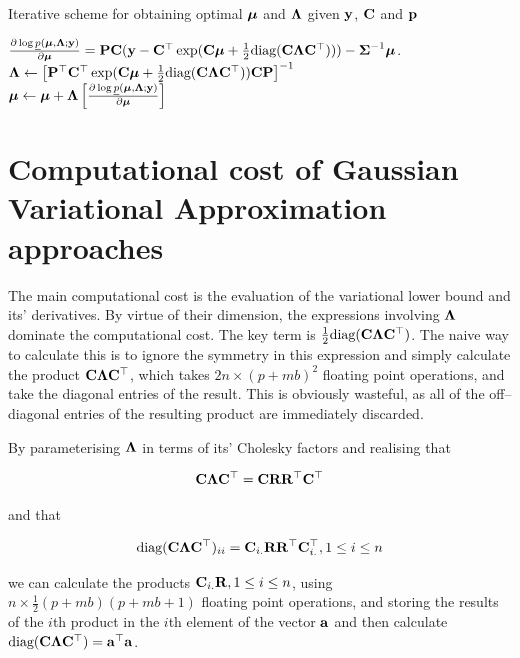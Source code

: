 \documentclass{amsart}[12pt]
\begin{document}
	\begin{algorithm}
		\caption[Algorithm GVA NR]{Iterative scheme for obtaining optimal ${\boldsymbol \mu}$ and ${\boldsymbol \Lambda}$
			given ${\bf y}$, ${\bf C}$ and ${\bf p}$}
		\label{alg:algorithm_nr}
		\begin{algorithmic}
			\REQUIRE $\frac{\partial \log \underline{p}({\boldsymbol \mu}, {\boldsymbol \Lambda}; {\bf y})}{\partial {\boldsymbol\mu}} = {\bf P} {\bf C} ({\bf y} - {\bf C}^\top \exp({\bf C} {\boldsymbol \mu} + \tfrac{1}{2} \text{diag}{({\bf C}{\boldsymbol\Lambda}{\bf C}^\top)})) - {\boldsymbol \Sigma}^{-1} {\boldsymbol \mu}$.
			\STATE ${\boldsymbol \Lambda} \leftarrow \left [ {\bf P}^\top {\bf C}^\top \exp({\bf C} {\boldsymbol \mu} + \tfrac{1}{2} \text{diag}({\bf C} {\boldsymbol \Lambda} {\bf C}^\top)) {\bf C} {\bf P} \right ]^{-1}$ \\ [1ex]
			\STATE ${\boldsymbol \mu} \leftarrow {\boldsymbol\mu} + {\boldsymbol \Lambda} \left [ \frac{\partial \log \underline{p}({\boldsymbol \mu}, {\boldsymbol \Lambda}; {\bf y})}{\partial {\boldsymbol\mu}} \right ]$
			\ENDWHILE
		\end{algorithmic}
	\end{algorithm}
		
		
	\section{Computational cost of Gaussian Variational Approximation approaches}
	
	The main computational cost is the evaluation of the variational lower bound and its' derivatives. By virtue
	of their dimension, the expressions involving ${\boldsymbol \Lambda}$ dominate the computational cost. The key term is
	$\frac{1}{2} \text{diag}({\bf C} {\boldsymbol \Lambda} {\bf C}^\top)$. The naive way to calculate this is to ignore the symmetry in
	this expression and simply calculate the product ${\bf C} {\boldsymbol \Lambda} {\bf C}^\top$, which takes $2 n \times (p + m
	b)^2$ floating point operations, and take the diagonal entries of the result. This is obviously wasteful, as
	all of the off--diagonal entries of the resulting product are immediately discarded.
	
	\noindent By parameterising ${\boldsymbol \Lambda}$ in terms of its' Cholesky factors and realising that
	
	\[
		{\bf C} {\boldsymbol \Lambda} {\bf C}^\top = {\bf C} {\bf R} {\bf R}^\top {\bf C}^\top
	\]
	
	\noindent and that
	
	\[
		\text{diag}({\bf C} {\boldsymbol \Lambda} {\bf C}^\top)_{ii} = {\bf C}_{i .} {\bf R} {\bf R}^\top {\bf C}_{i .}^\top, 1 \leq i \leq n
	\]
	
	\noindent we can calculate the products ${\bf C}_{i .} {\bf R}, 1 \leq i \leq n$, using $n \times \frac{1}{2}(p + m
	b)(p + m b   + 1)$ floating point operations, and storing the results of the $i$th product in the $i$th
	element of the   vector ${\bf a}$ and then calculate $\text{diag}({\bf C} {\boldsymbol \Lambda} {\bf C}^\top) = {\bf a}^\top {\bf a}$.
	
\end{document}

